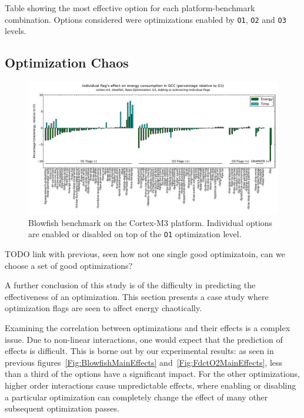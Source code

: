 \documentclass[twocolumn]{article}
\let\oldcaption\caption
\renewcommand{\caption}[1]{\oldcaption{\textup{#1}}}
\begin{document}
\begin{table}
	\caption{Table showing the most effective option for each platform-benchmark combination. Options considered were
	optimizations enabled by \texttt{O1}, \texttt{O2} and \texttt{O3} levels.}
	\label{Table:BestFlags}
\end{table}

\subsection{Optimization Chaos}

\begin{figure}[bt]
	\includegraphics[width=\linewidth,clip,trim=0.5cm 0 0cm 1.8cm]{cortex-m3/O1_addsub_blowfish.pdf}
	\caption{Blowfish benchmark on the Cortex-M3 platform. Individual options are enabled or disabled on top of the \texttt{O1} optimization level.}
	\label{Fig:AddsubO1Blowfish}
\end{figure}

TODO link with previous, seen how not one single good optimizatoin, can we choose  a set of good optimizations?

A further conclusion of this study is of the difficulty in predicting the effectiveness of an optimization. This section presents a case study where optimization flags are seen to affect energy chaotically.

Examining the correlation between optimizations and their effects is a complex issue. Due to non-linear interactions, one would expect that the prediction of effects is difficult. This is borne out by our experimental results: as seen in previous figures~\ref{Fig:BlowfishMainEffects} and~\ref{Fig:FdctO2MainEffects}, less than a third of the options have a significant impact. For the other optimizations, higher order interactions cause unpredictable effects, where enabling or disabling a particular optimization can completely change the effect of many other subsequent optimization passes.
\end{document}
